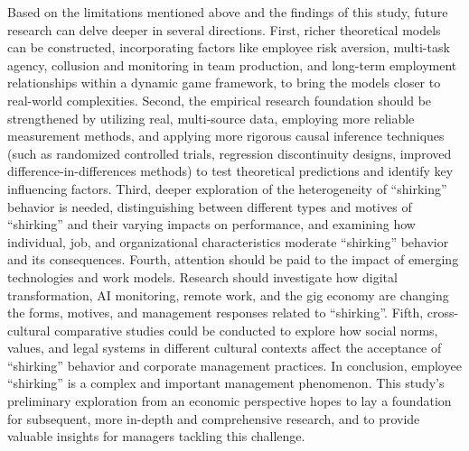 Based on the limitations mentioned above and the findings of this study, future research can delve deeper in several directions. First, richer theoretical models can be constructed, incorporating factors like employee risk aversion, multi-task agency, collusion and monitoring in team production, and long-term employment relationships within a dynamic game framework, to bring the models closer to real-world complexities. Second, the empirical research foundation should be strengthened by utilizing real, multi-source data, employing more reliable measurement methods, and applying more rigorous causal inference techniques (such as randomized controlled trials, regression discontinuity designs, improved difference-in-differences methods) to test theoretical predictions and identify key influencing factors. Third, deeper exploration of the heterogeneity of \enquote{shirking} behavior is needed, distinguishing between different types and motives of \enquote{shirking} and their varying impacts on performance, and examining how individual, job, and organizational characteristics moderate \enquote{shirking} behavior and its consequences. Fourth, attention should be paid to the impact of emerging technologies and work models. Research should investigate how digital transformation, AI monitoring, remote work, and the gig economy are changing the forms, motives, and management responses related to \enquote{shirking}. Fifth, cross-cultural comparative studies could be conducted to explore how social norms, values, and legal systems in different cultural contexts affect the acceptance of \enquote{shirking} behavior and corporate management practices. In conclusion, employee \enquote{shirking} is a complex and important management phenomenon. This study's preliminary exploration from an economic perspective hopes to lay a foundation for subsequent, more in-depth and comprehensive research, and to provide valuable insights for managers tackling this challenge.